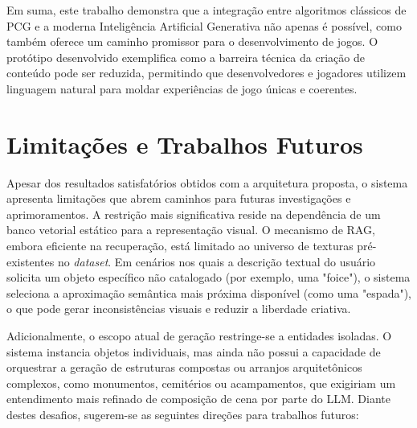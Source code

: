 Em suma, este trabalho demonstra que a integração entre algoritmos clássicos de
\gls{PCG} e a moderna Inteligência Artificial Generativa não apenas é possível,
como também oferece um caminho promissor para o desenvolvimento de jogos. O
protótipo desenvolvido exemplifica como a barreira técnica da criação de
conteúdo pode ser reduzida, permitindo que desenvolvedores e jogadores utilizem
linguagem natural para moldar experiências de jogo únicas e coerentes.

\section{Limitações e Trabalhos Futuros}

Apesar dos resultados satisfatórios obtidos com a arquitetura proposta, o
sistema apresenta limitações que abrem caminhos para futuras investigações e
aprimoramentos. A restrição mais significativa reside na dependência de um banco
vetorial estático para a representação visual. O mecanismo de \gls{RAG}, embora
eficiente na recuperação, está limitado ao universo de texturas pré-existentes
no \textit{dataset}. Em cenários nos quais a descrição textual do usuário solicita um
objeto específico não catalogado (por exemplo, uma "foice"), o sistema seleciona
a aproximação semântica mais próxima disponível (como uma "espada"), o que pode
gerar inconsistências visuais e reduzir a liberdade criativa.

Adicionalmente, o escopo atual de geração restringe-se a entidades isoladas. O
sistema instancia objetos individuais, mas ainda não possui a capacidade de
orquestrar a geração de estruturas compostas ou arranjos arquitetônicos
complexos, como monumentos, cemitérios ou acampamentos, que exigiriam um
entendimento mais refinado de composição de cena por parte do \gls{LLM}.  Diante
destes desafios, sugerem-se as seguintes direções para trabalhos futuros:


